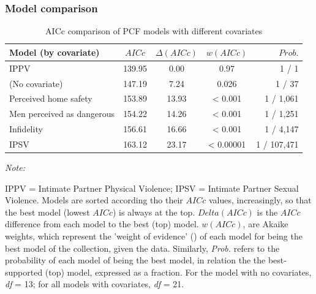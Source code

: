 \documentclass[
  bookmarksnumbered]{article}
\newenvironment{Shaded}{\begin{snugshade}}{\end{snugshade}}
\newcommand{\AttributeTok}[1]{\textcolor[rgb]{0.80,0.80,0.80}{#1}}
\newcommand{\FunctionTok}[1]{\textcolor[rgb]{0.94,0.94,0.56}{#1}}
\newcommand{\NormalTok}[1]{\textcolor[rgb]{0.80,0.80,0.80}{#1}}
\newcommand{\OtherTok}[1]{\textcolor[rgb]{0.94,0.94,0.56}{#1}}
\newcommand{\SpecialCharTok}[1]{\textcolor[rgb]{0.86,0.64,0.64}{#1}}
\newcommand{\StringTok}[1]{\textcolor[rgb]{0.80,0.58,0.58}{#1}}
\begin{document}
\subsubsection{Model comparison}\label{model-comparison-3}

\begin{Shaded}
\end{Shaded}

\begin{table}[H]
\centering
\caption{\label{tab:comp-m4}AICc comparison of PCF models with different covariates}
\centering
\begin{threeparttable}
\begin{tabular}[t]{lcccr}
\toprule
Model (by covariate) & $AICc$ & $\Delta(AICc)$ & $w(AICc)$ & $Prob.$\\
\midrule
IPPV & 139.95 & 0.00 & 0.97 & 1 / 1\\
(No covariate) & 147.19 & 7.24 & 0.026 & 1 / 37\\
Perceived home safety & 153.89 & 13.93 & < 0.001 & 1 / 1,061\\
Men perceived as dangerous & 154.22 & 14.26 & < 0.001 & 1 / 1,251\\
Infidelity & 156.61 & 16.66 & < 0.001 & 1 / 4,147\\
IPSV & 163.12 & 23.17 & < 0.00001 & 1 / 107,471\\
\bottomrule
\end{tabular}
\begin{tablenotes}[para]
\item \textit{Note: } 
\item IPPV = Intimate Partner Physical Violence; 
             IPSV = Intimate Partner Sexual Violence.
             Models are sorted according tho their $AICc$ values, increasingly, 
             so that the best model (lowest $AICc$) is always at the top. 
             $Delta(AICc)$ is the $AICc$ difference from each model to the best (top) model. 
             $w(AICc)$, are Akaike weights, which represent the 'weight of evidence'
             (\cite{portetPrimerModelSelection2020}) of each model for being the best model 
             of the collection, given the data. 
             Similarly, \textit{Prob.} refers to the probability of each model of being the 
             best model, in relation the the best-supported (top) model, expressed as a 
             fraction. For the model with no covariates, \textit{df} = 13; for all models 
             with covariates, \textit{df} = 21.
\end{tablenotes}
\end{threeparttable}
\end{table}
\end{document}
